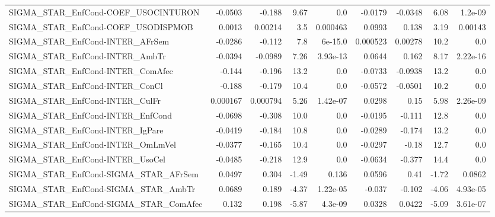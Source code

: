 \begin{tabular}{lrrrrrrrr}
SIGMA\_STAR\_EnfCond-COEF\_USOCINTURON   &     -0.0503 &       -0.188 &     9.67 &      0.0 &    -0.0179 &     -0.0348 &         6.08 &       1.2e-09 \\
SIGMA\_STAR\_EnfCond-COEF\_USODISPMOB    &      0.0013 &      0.00214 &      3.5 & 0.000463 &     0.0993 &       0.138 &         3.19 &       0.00143 \\
SIGMA\_STAR\_EnfCond-INTER\_AFrSem       &     -0.0286 &       -0.112 &      7.8 &  6e-15.0 &   0.000523 &     0.00278 &         10.2 &           0.0 \\
SIGMA\_STAR\_EnfCond-INTER\_AmbTr        &     -0.0394 &      -0.0989 &     7.26 & 3.93e-13 &     0.0644 &       0.162 &         8.17 &      2.22e-16 \\
SIGMA\_STAR\_EnfCond-INTER\_ComAfec      &      -0.144 &       -0.196 &     13.2 &      0.0 &    -0.0733 &     -0.0938 &         13.2 &           0.0 \\
SIGMA\_STAR\_EnfCond-INTER\_ConCl        &      -0.188 &       -0.179 &     10.4 &      0.0 &    -0.0572 &     -0.0501 &         10.2 &           0.0 \\
SIGMA\_STAR\_EnfCond-INTER\_CulFr        &    0.000167 &     0.000794 &     5.26 & 1.42e-07 &     0.0298 &        0.15 &         5.98 &      2.26e-09 \\
SIGMA\_STAR\_EnfCond-INTER\_EnfCond      &     -0.0698 &       -0.308 &     10.0 &      0.0 &    -0.0195 &      -0.111 &         12.8 &           0.0 \\
SIGMA\_STAR\_EnfCond-INTER\_IgPare       &     -0.0419 &       -0.184 &     10.8 &      0.0 &    -0.0289 &      -0.174 &         13.2 &           0.0 \\
SIGMA\_STAR\_EnfCond-INTER\_OmLmVel      &     -0.0377 &       -0.165 &     10.4 &      0.0 &    -0.0297 &       -0.18 &         12.7 &           0.0 \\
SIGMA\_STAR\_EnfCond-INTER\_UsoCel       &     -0.0485 &       -0.218 &     12.9 &      0.0 &    -0.0634 &      -0.377 &         14.4 &           0.0 \\
SIGMA\_STAR\_EnfCond-SIGMA\_STAR\_AFrSem  &      0.0497 &        0.304 &    -1.49 &    0.136 &     0.0596 &        0.41 &        -1.72 &        0.0862 \\
SIGMA\_STAR\_EnfCond-SIGMA\_STAR\_AmbTr   &      0.0689 &        0.189 &    -4.37 & 1.22e-05 &     -0.037 &      -0.102 &        -4.06 &      4.93e-05 \\
SIGMA\_STAR\_EnfCond-SIGMA\_STAR\_ComAfec &       0.132 &        0.198 &    -5.87 &  4.3e-09 &     0.0328 &      0.0422 &        -5.09 &      3.61e-07 \\

\end{tabular}
